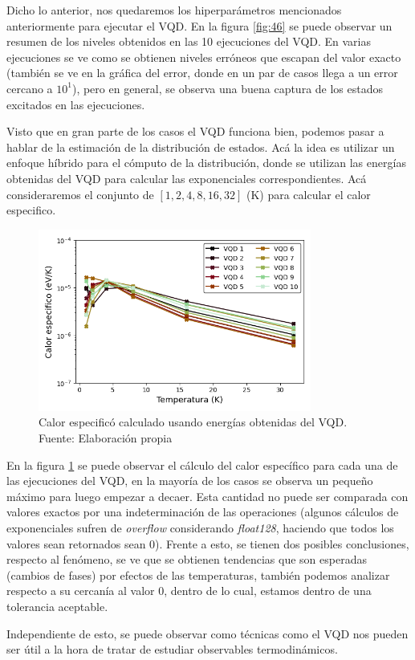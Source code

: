 Dicho lo anterior, nos quedaremos los hiperparámetros mencionados anteriormente para ejecutar el VQD. En la figura \ref{fig:46} se puede observar un resumen de los niveles obtenidos en las 10 ejecuciones del VQD. En varias ejecuciones se ve como se obtienen niveles erróneos que escapan del valor exacto (también se ve en la gráfica del error, donde en un par de casos llega a un error cercano a $10^{1}$), pero en general, se observa una buena captura de los estados excitados en las ejecuciones.

Visto que en gran parte de los casos el VQD funciona bien, podemos pasar a hablar de la estimación de la distribución de estados. Acá la idea es utilizar un enfoque híbrido para el cómputo de la distribución, donde se utilizan las energías obtenidas del VQD para calcular las exponenciales correspondientes. Acá consideraremos el conjunto de $[1, 2, 4, 8, 16, 32]$ (K) para calcular el calor especifico.

\begin{figure}[H]
\centering
\includegraphics[width=0.8\textwidth]{figures/S4/spins/temperatura3.png}
\caption{\label{fig:47} Calor especificó calculado usando energías obtenidas del VQD. Fuente: Elaboración propia}
\end{figure}

En la figura \ref{fig:47} se puede observar el cálculo del calor específico para cada una de las ejecuciones del VQD, en la mayoría de los casos se observa un pequeño máximo para luego empezar a decaer. Esta cantidad no puede ser comparada con valores exactos por una indeterminación de las operaciones (algunos cálculos de exponenciales sufren de \textit{overflow} considerando \textit{float128}, haciendo que todos los valores sean retornados sean 0). Frente a esto, se tienen dos posibles conclusiones, respecto al fenómeno, se ve que se obtienen tendencias que son esperadas (cambios de fases) por efectos de las temperaturas, también podemos analizar respecto a su cercanía al valor 0, dentro de lo cual, estamos dentro de una tolerancia aceptable.

Independiente de esto, se puede observar como técnicas como el VQD nos pueden ser útil a la hora de tratar de estudiar observables termodinámicos.

